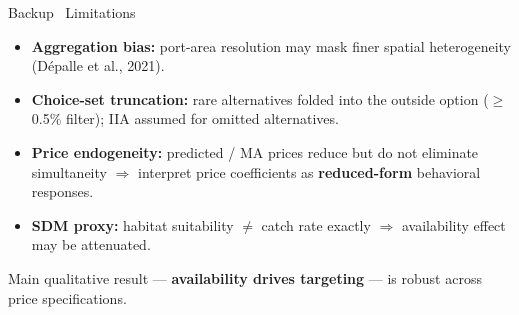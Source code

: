 \documentclass[aspectratio=169,11pt]{beamer}
\newcommand{\takeaway}[1]{\vfill\begin{takeawaybox}\small #1\end{takeawaybox}\vskip2pt}
\begin{document}
\begin{frame}{Backup \textbullet\ Limitations}
\small
\begin{itemize}
  \item \textbf{Aggregation bias:} port-area resolution may mask finer spatial heterogeneity (D\'epalle et al., 2021).
  \item \textbf{Choice-set truncation:} rare alternatives folded into the outside option ($\ge$0.5\% filter); IIA assumed for omitted alternatives.
  \item \textbf{Price endogeneity:} predicted / MA prices reduce but do not eliminate simultaneity $\Rightarrow$
        interpret price coefficients as \textbf{reduced-form} behavioral responses.
  \item \textbf{SDM proxy:} habitat suitability $\ne$ catch rate exactly $\Rightarrow$ availability effect may be attenuated.
\end{itemize}
\takeaway{Main qualitative result --- \textbf{availability drives targeting} --- is robust across price specifications.}
\end{frame}
\end{document}
